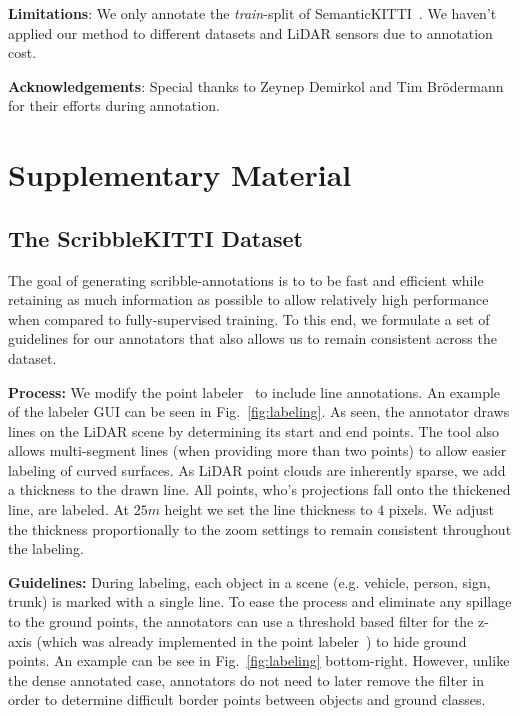 \documentclass[10pt,twocolumn,letterpaper]{article}
\begin{document}
\noindent \textbf{Limitations}: We only annotate the \textit{train}-split of SemanticKITTI~\cite{iccv2019semantickitti}. We haven't applied our method to different datasets and LiDAR sensors due to annotation cost.

\noindent \textbf{Acknowledgements}: Special thanks to Zeynep Demirkol and Tim Br\"odermann for their efforts during annotation.


\clearpage
{\small


}
\clearpage

\section{Supplementary Material}

\subsection{The ScribbleKITTI Dataset}

The goal of generating scribble-annotations is to to be fast and efficient while retaining as much information as possible to allow relatively high performance when compared to fully-supervised training. To this end, we formulate a set of guidelines for our annotators that also allows us to remain consistent across the dataset.

\noindent \textbf{Process: } We modify the point labeler~\cite{iccv2019semantickitti} to include line annotations. An example of the labeler GUI can be seen in Fig.~\ref{fig:labeling}. As seen, the annotator draws lines on the LiDAR scene by determining its start and end points. The tool also allows multi-segment lines (when providing more than two points) to allow easier labeling of curved surfaces. As LiDAR point clouds are inherently sparse, we add a thickness to the drawn line. All points, who's projections fall onto the thickened line, are labeled. At $25m$ height we set the line thickness to $4$ pixels. We adjust the thickness proportionally to the zoom settings to remain consistent throughout the labeling.

\noindent \textbf{Guidelines: } During labeling, each object in a scene (e.g. vehicle, person, sign, trunk) is marked with a single line. To ease the process and eliminate any spillage to the ground points, the annotators can use a threshold based filter for the z-axis (which was already implemented in the point labeler~\cite{iccv2019semantickitti}) to hide ground points. An example can be see in Fig.~\ref{fig:labeling} bottom-right. However, unlike the dense annotated case, annotators do not need to later remove the filter in order to determine difficult border points between objects and ground classes. 
\end{document}
